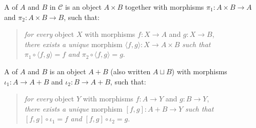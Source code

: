 A  of $A$ and $B$ in $\mathcal{C}$ is an object $A \times B$
together with morphisms $\pi_1 : A \times B \to A$ and $\pi_2 : A \times
B \to B$, such that:
\begin{quote}
  \emph{for every} object $X$ with morphisms $f : X \to A$ and $g : X \to B$,\\
  \emph{there exists a unique} morphism $\langle f, g \rangle : X \to A
  \times B$ \emph{such that}\\
  $\pi_1 \circ \langle f, g \rangle = f$ \emph{and} $\pi_2 \circ \langle f,
  g \rangle = g$.
\end{quote}
\medskip
\begin{center}
\end{center}
\medskip

A  of $A$ and $B$ is an object $A + B$ (also written
$A \sqcup B$) with morphisms $\iota_1 : A \to A + B$ and $\iota_2 : B \to
A + B$, such that:
\begin{quote}
  \emph{for every} object $Y$ with morphisms $f : A \to Y$ and $g : B
  \to Y$,\\
  \emph{there exists a unique} morphism $[f, g] : A + B \to Y$
  \emph{such that}\\
  $[f, g] \circ \iota_1 = f$ \emph{and} $[f, g] \circ \iota_2 = g$.
\end{quote}
\medskip
\begin{center}
\end{center}

